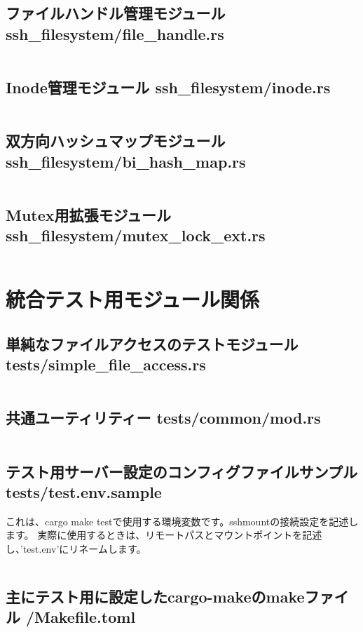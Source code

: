 \documentclass[paper=a4paper, fontsize=10pt, head_space=10mm, foot_space=17mm, gutter=17mm, line_length=185mm, twoside]{jlreq}
\begin{document}
\subsection{ファイルハンドル管理モジュール ssh\_filesystem/file\_handle.rs}
\inputminted[linenos, breaklines]{rust}{src/ssh_filesystem/file_handle.rs}
\clearpage

\subsection{Inode管理モジュール ssh\_filesystem/inode.rs}
\inputminted[linenos, breaklines]{rust}{src/ssh_filesystem/inode.rs}
\clearpage

\subsection{双方向ハッシュマップモジュール ssh\_filesystem/bi\_hash\_map.rs}
\inputminted[linenos, breaklines]{rust}{src/ssh_filesystem/bi_hash_map.rs}
\clearpage

\subsection{Mutex用拡張モジュール ssh\_filesystem/mutex\_lock\_ext.rs}
\inputminted[linenos, breaklines]{rust}{src/ssh_filesystem/mutex_lock_ext.rs}
\clearpage

\section{統合テスト用モジュール関係}
\subsection{単純なファイルアクセスのテストモジュール tests/simple\_file\_access.rs}
\inputminted[linenos, breaklines]{rust}{tests/simple_file_access.rs}
\clearpage

\subsection{共通ユーティリティー tests/common/mod.rs}
\inputminted[linenos, breaklines]{rust}{tests/common/mod.rs}
\clearpage

\subsection{テスト用サーバー設定のコンフィグファイルサンプル tests/test.env.sample}
 これは、cargo make testで使用する環境変数です。sshmountの接続設定を記述します。
 実際に使用するときは、リモートパスとマウントポイントを記述し、'test.env'にリネームします。
\inputminted[linenos, breaklines]{text}{tests/test.env.sample}

\subsection{主にテスト用に設定したcargo-makeのmakeファイル /Makefile.toml}
\inputminted[linenos, breaklines]{toml}{root/Makefile.toml}
\end{document}
